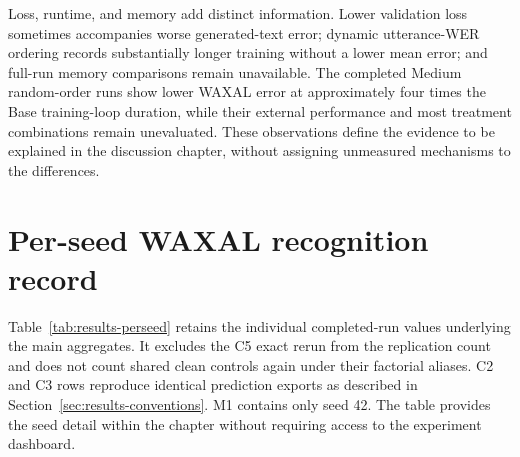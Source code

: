 \documentclass[12pt,a4paper]{report}
\begin{document}
Loss, runtime, and memory add distinct information. Lower validation loss sometimes accompanies worse generated-text error; dynamic utterance-WER ordering records substantially longer training without a lower mean error; and full-run memory comparisons remain unavailable. The completed Medium random-order runs show lower WAXAL error at approximately four times the Base training-loop duration, while their external performance and most treatment combinations remain unevaluated. These observations define the evidence to be explained in the discussion chapter, without assigning unmeasured mechanisms to the differences.

\clearpage
\section{Per-seed WAXAL recognition record}
\label{sec:results-perseed}

Table~\ref{tab:results-perseed} retains the individual completed-run values underlying the main aggregates. It excludes the C5 exact rerun from the replication count and does not count shared clean controls again under their factorial aliases. C2 and C3 rows reproduce identical prediction exports as described in Section~\ref{sec:results-conventions}. M1 contains only seed 42. The table provides the seed detail within the chapter without requiring access to the experiment dashboard.
\end{document}
